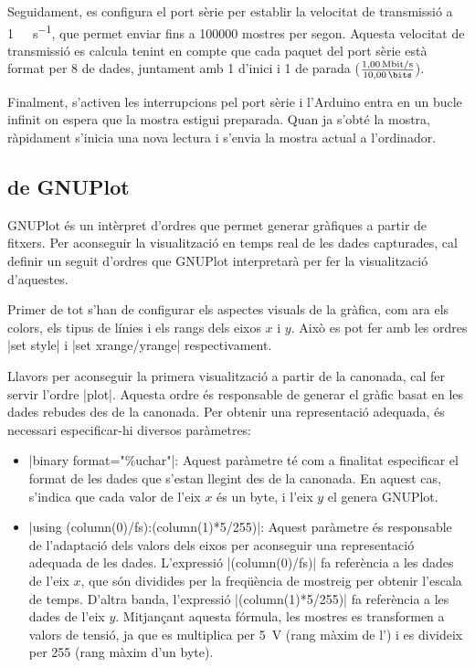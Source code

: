 \documentclass{tfgitic}[2023/06/30]
\begin{document}
Seguidament, es configura el port sèrie per establir la velocitat de
transmissió a \SI{1}{\mega\bit\per\second}, que permet enviar fins a
\num{100000} mostres per segon. Aquesta velocitat de transmissió es
calcula tenint en compte que cada paquet del port sèrie està format
per \SI{8}{\bits} de dades, juntament amb \SI{1}{\bit} d'inici i
\SI{1}{\bit} de parada ($\frac{\SI{1}{\mega\bit\per\second}}
{\SI{10}{\bits}}$).

Finalment, s'activen les interrupcions pel port sèrie i l'Arduino
entra en un bucle infinit on espera que la mostra estigui
preparada. Quan ja s'obté la mostra, ràpidament s'inicia una nova
lectura i s'envia la mostra actual a l'ordinador.

\subsection{ de GNUPlot}

GNUPlot és un intèrpret d'ordres que permet generar gràfiques a partir
de fitxers. Per aconseguir la visualització en temps real de les dades
capturades, cal definir un seguit d'ordres que GNUPlot interpretarà
per fer la visualització d'aquestes.

Primer de tot s'han de configurar els aspectes visuals de la gràfica,
com ara els colors, els tipus de línies i els rangs dels eixos $x$ i
$y$. Això es pot fer amb les ordres \ord|set style| i
\ord|set xrange/yrange| respectivament.

Llavors per aconseguir la primera visualització a partir de la
canonada, cal fer servir l'ordre \ord|plot|. Aquesta ordre és
responsable de generar el gràfic basat en les dades rebudes des de la
canonada. Per obtenir una representació adequada, és necessari
especificar-hi diversos paràmetres:

\begin{itemize}
	\item \ord|binary format="\%uchar"|: Aquest paràmetre té com a
          finalitat especificar el format de les dades que s'estan
          llegint des de la canonada. En aquest cas, s'indica que cada
          valor de l'eix $x$ és un byte, i l'eix $y$ el genera
          GNUPlot.
	\item \ord|using (column(0)/fs):(column(1)*5/255)|: Aquest
          paràmetre és responsable de l'adaptació dels valors dels
          eixos per aconseguir una representació adequada de les
          dades. L'expressió \ord|(column(0)/fs)| fa referència a les
          dades de l'eix $x$, que són dividides per la freqüència de
          mostreig per obtenir l'escala de temps. D'altra banda,
          l'expressió \ord|(column(1)*5/255)| fa referència a les
          dades de l'eix $y$. Mitjançant aquesta fórmula, les mostres
          es transformen a valors de tensió, ja que es multiplica per
          \SI{5}{\V} (rang màxim de l') i es divideix per
          \num{255} (rang màxim d'un byte).
\end{itemize}
\end{document}
